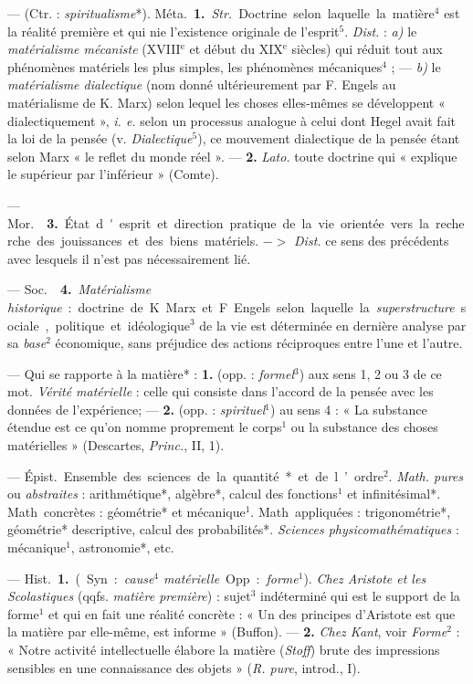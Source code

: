 \begin{itemize}[leftmargin=1cm, label=, itemsep=1pt]
 —  (Ctr. : {\it spiritualisme}*). \si{Méta.}
{\bf 1.} {\it Str.} Doctrine selon laquelle la matière$^4$ est la réalité
première et qui nie l'existence originale de l'esprit$^5$. {\it Dist.} :
{\it a)} le {\it matérialisme mécaniste} ({\footnotesize XVIII}$^\text{e}$ et
début du {\footnotesize XIX}$^\text{e}$ siècles) qui réduit tout aux
phénomènes matériels les plus simples, les phénomènes mécaniques$^4$ ; —
{\it b)} le {\it matérialisme dialectique} (nom donné ultérieurement par F.
Engels au matérialisme de K. Marx) selon lequel les choses elles-mêmes se
développent « dialectiquement », {\it i. e.} selon un processus analogue à
celui dont Hegel avait fait la loi de la pensée (v. {\it Dialectique}$^5$),
ce mouvement dialectique de la pensée étant selon Marx « le reflet du monde
réel ». — {\bf 2.} {\it Lato.} toute doctrine qui « explique le
supérieur par l’inférieur » (Comte).

— \si{Mor.}  {\bf 3.} État d'esprit et direction pratique de
la vie orientée vers la recherche des jouissances et des biens matériels. $->$
{\it Dist.} ce sens des précédents avec lesquels il n’est pas nécessairement
lié.

— \si{Soc.}  {\bf 4.} {\it Matérialisme historique} : doctrine
de K. Marx et F. Engels selon laquelle la {\it superstructure} sociale,
politique et idéologique$^3$ de la vie est déterminée en dernière analyse par
sa {\it base}$^2$ économique, sans préjudice des actions réciproques entre
l’une et l’autre.

 — Qui se rapporte à la matière* : {\bf 1.} (opp. :
{\it formel}$^3$) aux sens 1, 2 ou 3 de ce mot. {\it Vérité matérielle} :
celle qui consiste dans l’accord de la pensée avec les données de
l’expérience; — {\bf 2.} (opp. : {\it spirituel}$^1$) au sens 4 : « La
substance étendue est ce qu’on nomme proprement le corps$^1$ ou la substance
des choses matérielles » (Descartes, {\it Princ.}, II, 1).

 — \si{Épist.} Ensemble des sciences de la quantité* et de
l’ordre$^2$. {\it Math. pures} ou {\it abstraites} : arithmétique*, algèbre*,
calcul des fonctions$^1$ et infinitésimal*. \si{Math. concrètes} : géométrie*
et mécanique$^1$. \si{Math. appliquées} : trigonométrie*, géométrie*
descriptive, calcul des probabilités*. {\it Sciences physicomathématiques} :
mécanique$^1$, astronomie*, etc.

 — \si{Hist.} {\bf 1.} (Syn. : {\it cause$^4$ matérielle}. Opp. :
{\it forme}$^1$). {\it Chez Aristote et les Scolastiques} (qqfs. {\it matière
première}) : sujet$^3$ indéterminé qui est le support de la forme$^1$ et qui
en fait une réalité concrète : « Un des principes d’Aristote est que la
matière par elle-même, est informe » (Buffon). — {\bf 2.} {\it Chez Kant},
voir {\it Forme}$^2$ :
« Notre activité intellectuelle élabore la matière ({\it Stoff}) brute des
impressions sensibles en une connaissance des objets » ({\it R. pure},
introd., I).


\end{itemize}
